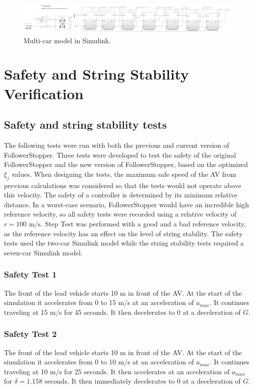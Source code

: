 \documentclass[conference]{IEEEtran}
\begin{document}
\begin{figure}[htbp]
\centerline{\includegraphics[width=3.5 in]{7carmodel.png}}
\caption{Multi-car model in Simulink.}
\label{multicarmodel2}
\end{figure}






\section{Safety and String Stability Verification}

\subsection{Safety and string stability tests}
The following tests were run with both the previous and current version of FollowerStopper. Three tests were developed to test the safety of the original FollowerStopper and the new version of FollowerStopper, based on the optimized $\xi_j$ values. When designing the tests, the maximum safe speed of the AV from previous calculations was considered so that the tests would not operate above this velocity. The safety of a controller is determined by its minimum relative distance. In a worst-case scenario, FollowerStopper would have an incredible high reference velocity, so all safety tests were recorded using a relative velocity of $r=100$ m/s. Step Test was performed with a good and a bad reference velocity, as the reference velocity has an effect on the level of string stability. The safety tests used the two-car Simulink model while the string stability tests required a seven-car Simulink model.
\subsubsection{Safety Test 1}
The front of the lead vehicle starts 10 m in front of the AV. At the start of the simulation it accelerates from 0 to 15 m/s at an acceleration of $a_{max}$. It continues traveling at 15 m/s for 45 seconds. It then decelerates to 0 at a deceleration of $G$.
\subsubsection{Safety Test 2}
The front of the lead vehicle starts 10 m in front of the AV. At the start of the simulation it accelerates from 0 to 10 m/s at an acceleration of $a_{max}$. It continues traveling at 10 m/s for 25 seconds. It then accelerates at an acceleration of $a_{max}$ for $\delta=1.158$ seconds. It then immediately decelerates to 0 at a deceleration of $G$.
\end{document}
